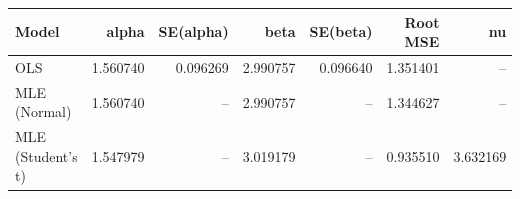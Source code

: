 \begin{tabular}{lrrrrrr}
\toprule
Model & alpha & SE(alpha) & beta & SE(beta) & Root MSE & nu \\
\midrule
OLS & 1.560740 & 0.096269 & 2.990757 & 0.096640 & 1.351401 & -- \\
MLE (Normal) & 1.560740 & -- & 2.990757 & -- & 1.344627 & -- \\
MLE (Student's t) & 1.547979 & -- & 3.019179 & -- & 0.935510 & 3.632169 \\
\bottomrule
\end{tabular}
